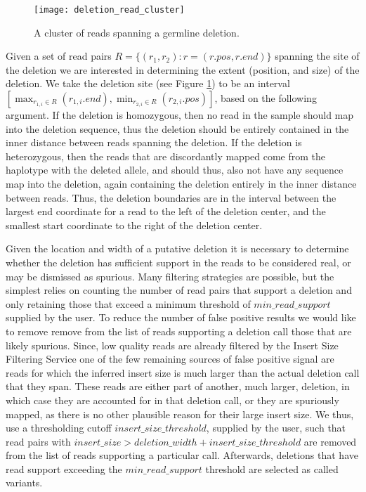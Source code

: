 \begin{figure}[H]
    \texttt{[image: deletion\_read\_cluster]}
    \centering
    \caption {A cluster of reads spanning a germline deletion.}
    \label{fig:deletion_read_cluster}
\end{figure}

Given a set of read pairs $R = \{(r_1,r_2) : r=(r.pos, r.end)\}$ spanning the site of the deletion we are interested in determining the extent (position, and size) of the deletion. We take the deletion site (see Figure \ref{fig:deletion_read_cluster}) to be an interval $[\max_{r_{1,i} \in R}{(r_{1,i}.end)}, \min_{r_{2,i} \in R}{(r_{2,i}.pos)}]$, based on the following argument. If the deletion is homozygous, then no read in the sample should map into the deletion sequence, thus the deletion should be entirely contained in the inner distance between reads spanning the deletion. If the deletion is heterozygous, then the reads that are discordantly mapped come from the haplotype with the deleted allele, and should thus, also not have any sequence map into the deletion, again containing the deletion entirely in the inner distance between reads. Thus, the deletion boundaries are in the interval between the largest end coordinate for a read to the left of the deletion center, and the smallest start coordinate to the right of the deletion center.

Given the location and width of a putative deletion it is necessary to determine whether the deletion has sufficient support in the reads to be considered real, or may be dismissed as spurious. Many filtering strategies are possible, but the simplest relies on counting the number of read pairs that support a deletion and only retaining those that exceed a minimum threshold of $min\_read\_support$ supplied by the user. To reduce the number of false positive results we would like to remove remove from the list of reads supporting a deletion call those that are likely spurious. Since, low quality reads are already filtered by the Insert Size Filtering Service one of the few remaining sources of false positive signal are reads for which the inferred insert size is much larger than the actual deletion call that they span. These reads are either part of another, much larger, deletion, in which case they are accounted for in that deletion call, or they are spuriously mapped, as there is no other plausible reason for their large insert size. We thus, use a thresholding cutoff $insert\_size\_threshold$, supplied by the user, such that read pairs with $insert\_size > deletion\_width + insert\_size\_threshold$ are removed from the list of reads supporting a particular call. Afterwards, deletions that have read support exceeding the $min\_read\_support$ threshold are selected as called variants. 

